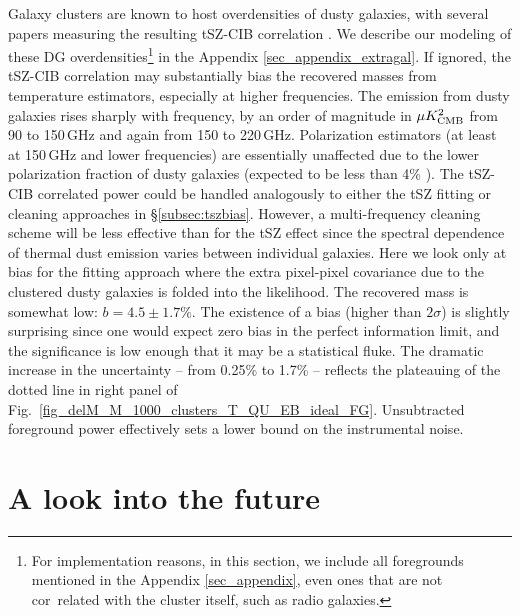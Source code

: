 Galaxy clusters are known to host overdensities of dusty galaxies, with several papers measuring the resulting tSZ-CIB correlation \citep{actdunkley2013, george2015, PLANCKTSZCIB2016}.
We describe our modeling of these DG overdensities\footnote{For implementation reasons, in this section, we include all foregrounds mentioned in the Appendix \ref{sec_appendix}, even ones that are not cor\
related with the cluster itself, such as radio galaxies.} in the Appendix \ref{sec_appendix_extragal}.
If ignored, the tSZ-CIB correlation may substantially bias the recovered masses from temperature estimators, especially at higher frequencies.
The emission from dusty galaxies rises sharply with frequency, by an order of magnitude in $\mu K^2_{\rm CMB}$ from 90 to 150\,GHz and again from 150 to 220\,GHz.
Polarization estimators (at least at 150\,GHz and lower frequencies) are essentially unaffected due to the lower polarization fraction  of dusty galaxies (expected to be less than 4\% \citep{seiffert2007,sptpol_delensing_2017}).
The tSZ-CIB correlated power could be handled analogously to either the tSZ fitting or cleaning approaches in \S\ref{subsec:tszbias}.
However, a multi-frequency cleaning scheme will be less effective than for the tSZ effect since the spectral dependence of thermal dust emission varies between individual galaxies.
Here we look only at bias for the fitting approach where the extra pixel-pixel covariance due to the clustered dusty galaxies is folded into the likelihood.
The recovered mass is somewhat low: $b=4.5 \pm 1.7\%$.
The existence of a bias (higher than $2\sigma$) is slightly surprising since one would expect zero bias in the perfect information limit, and the significance is low enough that it may be a statistical fluke.
The dramatic increase in the uncertainty -- from 0.25\% to 1.7\% -- reflects the plateauing of the dotted line in right panel of Fig.~\ref{fig_delM_M_1000_clusters_T_QU_EB_ideal_FG}.
Unsubtracted foreground power effectively sets a lower bound on the instrumental noise.

\section{A look into the future}
\label{sec_forecast}

